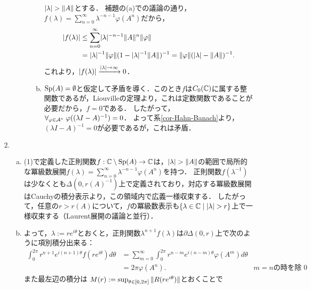 \documentclass[uplatex,dvipdfmx]{jsreport}
\begin{document}
\begin{Proof}
\begin{enumerate}
\begin{description}
\begin{enumerate}[(a)]
                $\lvert\lambda\rvert>\|A\|$とする．
                補題の(a)での議論の通り，$f(\lambda)=\sum_{n=0}^\infty\lambda^{-n-1}\varphi(A^n)$だから，
                \begin{align*}
                    \lvert f(\lambda)\rvert&\le\sum^\infty_{n=0}\lvert\lambda\rvert^{-n-1}\|A\|^n\|\varphi\|\\
                    &=\lvert\lambda\rvert^{-1}\|\varphi\|(1-\lvert\lambda\rvert^{-1}\|A\|)^{-1}=\|\varphi\|(\lvert\lambda\rvert-\|A\|)^{-1}.
                \end{align*}
                これより，$\lvert f(\lambda)\rvert\xrightarrow{\lvert\lambda\rvert\to\infty}0$．
                \item $\mathrm{Sp}(A)=\emptyset$と仮定して矛盾を導く．このとき$f$は$C_0(\mathbb{C})$に属する整関数であるが，Liouvilleの定理より，これは定数関数であることが必要だから，$f=0$である．
                したがって，$\forall_{\varphi\in\mathcal{A}^*}\;\varphi((\lambda I-A)^{-1})=0$．
                よって系\ref{cor-Hahn-Banach}より，$(\lambda I-A)^{-1}=0$が必要であるが，これは矛盾．
            \end{enumerate}
        \end{description}
        \item \begin{enumerate}[(a)]
            \item (1)で定義した正則関数$f:\mathbb{C}\setminus\mathrm{Sp}(A)\to\mathbb{C}$は，$\lvert\lambda\rvert>\|A\|$の範囲で局所的な冪級数展開$f(\lambda)=\sum^\infty_{n=0}\lambda^{-n-1}\varphi(A^n)$を持つ．
            正則関数$f(\lambda^{-1})$は少なくとも$\Delta(0,r(A)^{-1})$上で定義されており，対応する冪級数展開はCauchyの積分表示より，この領域内で広義一様収束する．
            したがって，任意の$r>r(A)$について，$f$の冪級数表示も$\left\{\lambda\in\mathbb{C}\mid\lvert\lambda\rvert>r\right\}$上で一様収束する（Laurent展開の議論と並行）．
            \item よって，$\lambda:=re^{i\theta}$とおくと，正則関数$\lambda^{n+1}f(\lambda)$は$\partial\Delta(0,r)$上で次のように項別積分出来る：
            \begin{align*}
                \int^{2\pi}_0r^{n+1}e^{i(n+1)\theta}f(re^{i\theta})d\theta&=\sum^\infty_{m=0}\int^{2\pi}_0r^{n-m}e^{i(n-m)\theta}\varphi(A^m)d\theta\\
                &=2\pi\varphi(A^n).&m=n\text{の時を除いて積分は}0
            \end{align*}
            また最左辺の積分は
            $M(r):=\sup_{\theta\in[0,2\pi]}\|R(re^{i\theta})\|$とおくことで
            \begin{align*}

\end{align*}
\end{enumerate}
\end{enumerate}
\end{Proof}
\end{document}
